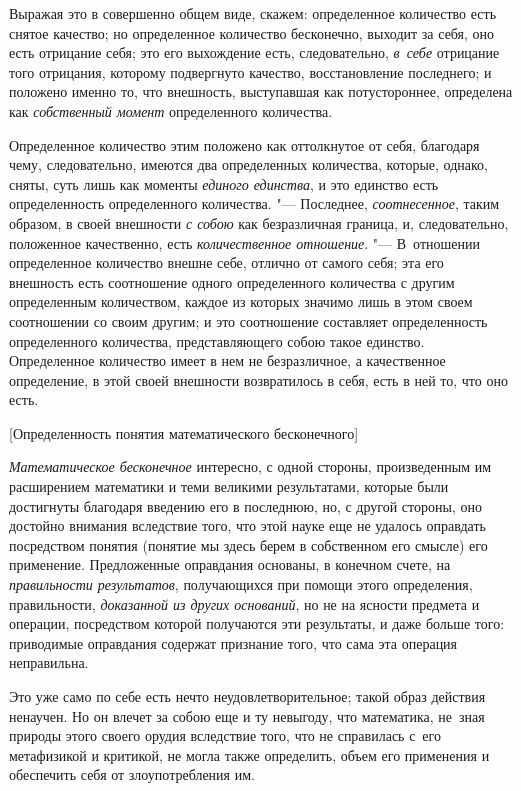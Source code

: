 Выражая это в совершенно общем виде, скажем: определенное количество есть
снятое качество; но определенное количество бесконечно, выходит за себя, оно
есть отрицание себя; это его выхождение есть, следовательно, {\em в~себе}
отрицание того отрицания, которому подвергнуто качество, восстановление
последнего; и положено именно то, что внешность, выступавшая как потустороннее,
определена как {\em собственный момент} определенного количества.

Определенное количество этим положено как оттолкнутое от себя, благодаря чему,
следовательно, имеются два определенных количества, которые, однако, сняты,
суть лишь как моменты {\em единого единства}, и это единство есть
определенность определенного количества. "--- Последнее, {\em соотнесенное},
таким образом, в своей внешности {\em с собою} как безразличная граница, и,
следовательно, положенное качественно, есть {\em количественное отношение}.
"--- В~отношении определенное количество внешне себе, отлично от самого себя;
эта его внешность есть соотношение одного определенного количества с другим
определенным количеством, каждое из которых значимо лишь в этом своем
соотношении со своим другим; и это соотношение составляет определенность
определенного количества, представляющего собою такое единство. Определенное
количество имеет в нем не безразличное, а качественное определение, в этой
своей внешности возвратилось в себя, есть в ней то, что оно есть.

%
{[Определенность понятия математического бесконечного]}

{\em Математическое бесконечное} интересно, с одной стороны, произведенным им
расширением математики и теми великими результатами, которые были достигнуты
благодаря введению его в последнюю, но, с другой стороны, оно достойно внимания
вследствие того, что этой науке еще не удалось оправдать посредством понятия
(понятие мы здесь берем в собственном его смысле) его применение. Предложенные
оправдания основаны, в конечном счете, на {\em правильности результатов},
получающихся при помощи этого определения, правильности,
{\em доказанной из других оснований}, но не на ясности предмета и операции,
посредством которой получаются эти результаты, и даже больше того: приводимые
оправдания содержат признание того, что сама эта операция неправильна.

Это уже само по себе есть нечто неудовлетворительное; такой образ действия
ненаучен. Но он влечет за собою еще и ту невыгоду, что математика, не~зная
природы этого своего орудия вследствие того, что не справилась с~его
метафизикой и критикой, не могла также определить, объем его применения
и обеспечить себя от злоупотребления им.

